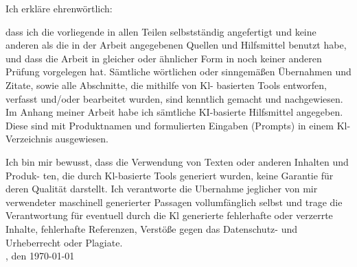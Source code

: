 

Ich erkläre ehrenwörtlich:

dass ich die vorliegende \art\xspace in allen Teilen selbstständig angefertigt und keine anderen als die in der Arbeit angegebenen Quellen und Hilfsmittel benutzt habe, und dass die Arbeit in gleicher oder ähnlicher Form in noch keiner anderen Prüfung vorgelegen hat. Sämtliche wörtlichen oder sinngemäßen Übernahmen und Zitate, sowie alle Abschnitte, die mithilfe von Kl- basierten Tools entworfen, verfasst und/oder bearbeitet wurden, sind kenntlich gemacht und nachgewiesen. Im Anhang meiner Arbeit habe ich sämtliche KI-basierte Hilfsmittel angegeben. Diese sind mit Produktnamen und formulierten Eingaben (Prompts) in einem Kl-Verzeichnis ausgewiesen.

Ich bin mir bewusst, dass die Verwendung von Texten oder anderen Inhalten und Produk- ten, die durch Kl-basierte Tools generiert wurden, keine Garantie für deren Qualität darstellt. Ich verantworte die Ubernahme jeglicher von mir verwendeter maschinell generierter Passagen vollumfänglich selbst und trage die Verantwortung für eventuell durch die Kl generierte fehlerhafte oder verzerrte Inhalte, fehlerhafte Referenzen, Verstöße gegen das Datenschutz- und Urheberrecht oder Plagiate.\\

\ort, den \today



\autor\\
